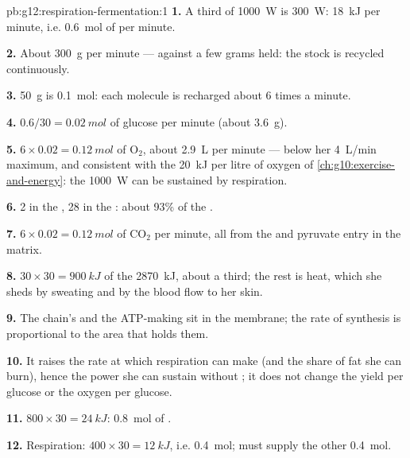 \begin{solution}{pb:g12:respiration-fermentation:1}
\textbf{1.} A third of \qty{1000}{W} is \qty{300}{W}: \qty{18}{kJ} per
minute, i.e. \qty{0.6}{mol} of  per minute.

\textbf{2.} About \qty{300}{g} per minute --- against a few grams held:
the stock is recycled continuously.

\textbf{3.} \qty{50}{g} is \qty{0.1}{mol}: each molecule is recharged
about 6 times a minute.

\textbf{4.} $0.6/30 = \qty{0.02}{mol}$ of glucose per minute (about
\qty{3.6}{g}).

\textbf{5.} $6 \times 0.02 = \qty{0.12}{mol}$ of $\mathrm{O_2}$, about
\qty{2.9}{L} per minute --- below her \qty{4}{L/min} maximum, and
consistent with the \qty{20}{kJ} per litre of oxygen of
\cref{ch:g10:exercise-and-energy}: the \qty{1000}{W} can be sustained
by respiration.

\textbf{6.} 2 in the , 28 in the : about 93\%
of the .

\textbf{7.} $6 \times 0.02 = \qty{0.12}{mol}$ of $\mathrm{CO_2}$ per
minute, all from the  and pyruvate entry in the matrix.

\textbf{8.} $30 \times 30 = \qty{900}{kJ}$ of the \qty{2870}{kJ}, about
a third; the rest is heat, which she sheds by sweating and by the
blood flow to her skin.

\textbf{9.} The chain's  and the ATP-making  sit in the
membrane; the rate of  synthesis is proportional to the area that
holds them.

\textbf{10.} It raises the rate at which respiration can make 
(and the share of fat she can burn), hence the power she can sustain
without ; it does not change the yield per glucose or the
oxygen per glucose.

\textbf{11.} $800 \times 30 = \qty{24}{kJ}$: \qty{0.8}{mol} of .

\textbf{12.} Respiration: $400 \times 30 = \qty{12}{kJ}$, i.e.
\qty{0.4}{mol};  must supply the other \qty{0.4}{mol}.


\end{solution}
